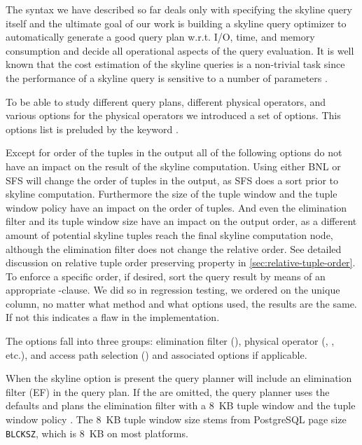 The syntax we have described so far deals only with specifying the
skyline query itself and the ultimate goal of our work is building a
skyline query optimizer to automatically generate a good query plan
w.r.t. I/O, time, and memory consumption and decide all operational
aspects of the query evaluation.  It is well known that the cost
estimation of the skyline queries is a non-trivial task
\citep{Chaudhuri2006} since the performance of a skyline query is
sensitive to a number of parameters \citep{Godfrey2007}.

To be able to study different query plans, different physical
operators, and various options for the physical operators we
introduced a set of options. This options list is preluded by the
keyword .

Except for order of the tuples in the output all of the following
options do not have an impact on the result of the skyline
computation. Using either BNL or SFS will change the order of tuples in
the output, as SFS does a sort prior to skyline
computation. Furthermore the size of the tuple window and the tuple
window policy have an impact on the order of tuples. And even the
elimination filter and its tuple window size have an impact on the
output order, as a different amount of potential skyline tuples reach
the final skyline computation node, although the elimination filter
does not change the relative order.  See detailed discussion on
relative tuple order preserving property in
\autoref{sec:relative-tuple-order}.  
To enforce a specific order, if
desired, sort the query result by means of an appropriate
-clause.  
We did so in regression testing, we
ordered on the unique  column, no matter what method and
what options used, the results are the same. If not this indicates a
flaw in the implementation.

The options fall into three groups: elimination filter
(), physical operator (, ,
etc.), and access path selection () and associated
options if applicable.

When the skyline option  is present the query planner
will include an elimination filter (EF) in the query plan.
If the
 are omitted, the query planner uses the defaults
and plans the elimination filter with a 8~KB tuple window and the
tuple window policy . The 8~KB tuple window size
stems from PostgreSQL page size \texttt{BLCKSZ}, which is 8~KB on most
platforms.

